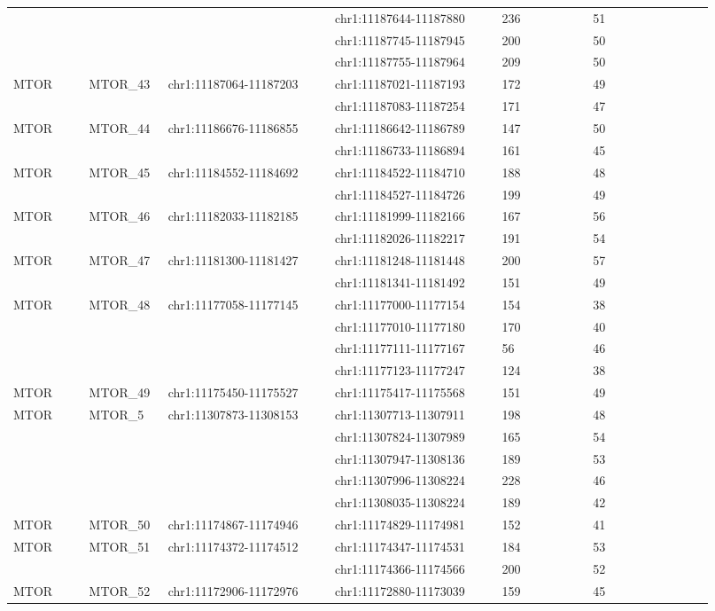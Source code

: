 \begin{landscape}
\begin{longtable}{p{0.1\linewidth}|p{0.1\linewidth}p{0.22\linewidth}p{0.22\linewidth}p{0.12\linewidth}p{0.16\linewidth}}
\\
 & & & chr1:11187644-11187880 & 236 & 51
\\
 & & & chr1:11187745-11187945 & 200 & 50
\\
 & & & chr1:11187755-11187964 & 209 & 50
\\
MTOR & MTOR\_43 & chr1:11187064-11187203 & chr1:11187021-11187193 & 172 & 49
\\
 & & & chr1:11187083-11187254 & 171 & 47
\\
MTOR & MTOR\_44 & chr1:11186676-11186855 & chr1:11186642-11186789 & 147 & 50
\\
 & & & chr1:11186733-11186894 & 161 & 45
\\
MTOR & MTOR\_45 & chr1:11184552-11184692 & chr1:11184522-11184710 & 188 & 48
\\
 & & & chr1:11184527-11184726 & 199 & 49
\\
MTOR & MTOR\_46 & chr1:11182033-11182185 & chr1:11181999-11182166 & 167 & 56
\\
 & & & chr1:11182026-11182217 & 191 & 54
\\
MTOR & MTOR\_47 & chr1:11181300-11181427 & chr1:11181248-11181448 & 200 & 57
\\
 & & & chr1:11181341-11181492 & 151 & 49
\\
MTOR & MTOR\_48 & chr1:11177058-11177145 & chr1:11177000-11177154 & 154 & 38
\\
 & & & chr1:11177010-11177180 & 170 & 40
\\
 & & & chr1:11177111-11177167 & 56 & 46
\\
 & & & chr1:11177123-11177247 & 124 & 38
\\
MTOR & MTOR\_49 & chr1:11175450-11175527 & chr1:11175417-11175568 & 151 & 49
\\
MTOR & MTOR\_5 & chr1:11307873-11308153 & chr1:11307713-11307911 & 198 & 48
\\
 & & & chr1:11307824-11307989 & 165 & 54
\\
 & & & chr1:11307947-11308136 & 189 & 53
\\
 & & & chr1:11307996-11308224 & 228 & 46
\\
 & & & chr1:11308035-11308224 & 189 & 42
\\
MTOR & MTOR\_50 & chr1:11174867-11174946 & chr1:11174829-11174981 & 152 & 41
\\
MTOR & MTOR\_51 & chr1:11174372-11174512 & chr1:11174347-11174531 & 184 & 53
\\
 & & & chr1:11174366-11174566 & 200 & 52
\\
MTOR & MTOR\_52 & chr1:11172906-11172976 & chr1:11172880-11173039 & 159 & 45

\end{longtable}
\end{landscape}
